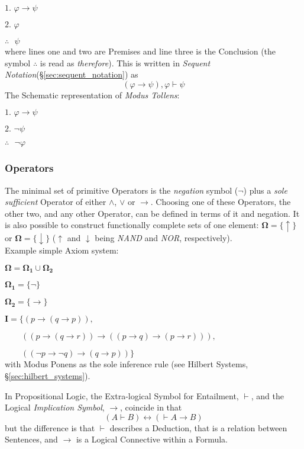 $\textrm{1. }\varphi \rightarrow \psi$

$\textrm{2. }\varphi$

$\therefore\textrm{ }\psi$
\\
where lines one and two are Premises and line three is the Conclusion
(the symbol $\therefore$ is read as \emph{therefore}). This is written in
\emph{Sequent Notation}(\S\ref{sec:sequent_notation}) as
\[(\varphi \rightarrow \psi), \varphi \vdash \psi\]
The Schematic representation of \emph{Modus Tollens}:

$\textrm{1. }\varphi \rightarrow \psi$

$\textrm{2. }\neg\psi$

$\therefore\textrm{ }\neg\varphi$

\subsubsection{Operators}

The minimal set of primitive Operators is the \emph{negation} symbol
($\neg$) plus a \emph{sole sufficient} Operator of either $\land$,
$\lor$ or $\rightarrow$. Choosing one of these Operators, the other
two, and any other Operator, can be defined in terms of it and
negation. It is also possible to construct functionally complete sets
of one element: $\mathbf{\Omega} = \{\uparrow\}$ or $\mathbf{\Omega} =
\{\downarrow\}$ ($\uparrow$ and $\downarrow$ being \emph{NAND} and
\emph{NOR}, respectively).
\\
Example simple Axiom system:

$\mathbf{\Omega} = \mathbf{\Omega_1} \cup \mathbf{\Omega_2}$

$\mathbf{\Omega_1} = \{\neg\}$

$\mathbf{\Omega_2} = \{\rightarrow\}$

$\mathbf{I} = \{ (p \rightarrow (q \rightarrow p)),$

$\qquad((p \rightarrow (q \rightarrow r)) \rightarrow
(( p \rightarrow q) \rightarrow (p \rightarrow r))),$

$\qquad(( \neg p \rightarrow \neg q ) \rightarrow (q \rightarrow p ))
\}$\\ with Modus Ponens as the sole inference rule (see Hilbert
Systems, \S\ref{sec:hilbert_systems}).

In Propositional Logic, the Extra-logical Symbol for Entailment,
$\vdash$, and the Logical \emph{Implication Symbol}, $\rightarrow$,
coincide in that
\[(A \vdash B) \leftrightarrow (\vdash A \rightarrow B)\]
but the difference is that $\vdash$ describes a Deduction, that is a
relation between Sentences, and $\rightarrow$ is a Logical Connective
within a Formula.

